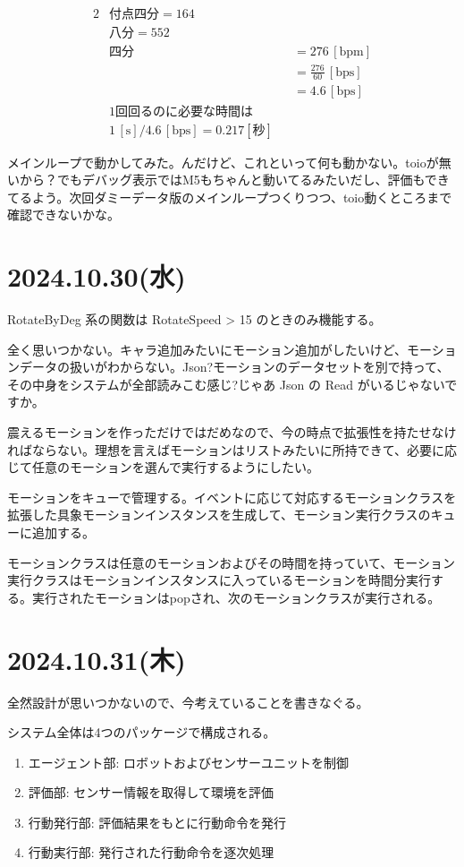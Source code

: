 \documentclass[fleqn,twocolumn]{mynote}
\begin{document}
\begin{alignat*}{2}
  & 付点四分 = 164 \\
  & 八分 = 552 \\
  & 四分 &&= 276 \, [\text{bpm}] \\
  & &&= \frac{276}{60} \, [\text{bps}] \\
  & &&= 4.6 \, [\text{bps}] \\
  & 1\text{回回るのに必要な時間は} \\
  & 1 \, [\text{s}] / 4.6 \, [\text{bps}] = 0.217[\text{秒}]
\end{alignat*}

メインループで動かしてみた。んだけど、これといって何も動かない。toioが無いから？でもデバッグ表示ではM5もちゃんと動いてるみたいだし、評価もできてるよう。次回ダミーデータ版のメインループつくりつつ、toio動くところまで確認できないかな。

\section*{2024.10.30(水)}
RotateByDeg 系の関数は RotateSpeed > 15 のときのみ機能する。

全く思いつかない。キャラ追加みたいにモーション追加がしたいけど、モーションデータの扱いがわからない。Json?モーションのデータセットを別で持って、その中身をシステムが全部読みこむ感じ?じゃあ Json の Read がいるじゃないですか。

震えるモーションを作っただけではだめなので、今の時点で拡張性を持たせなければならない。理想を言えばモーションはリストみたいに所持できて、必要に応じて任意のモーションを選んで実行するようにしたい。

モーションをキューで管理する。イベントに応じて対応するモーションクラスを拡張した具象モーションインスタンスを生成して、モーション実行クラスのキューに追加する。

モーションクラスは任意のモーションおよびその時間を持っていて、モーション実行クラスはモーションインスタンスに入っているモーションを時間分実行する。実行されたモーションはpopされ、次のモーションクラスが実行される。

\section*{2024.10.31(木)}
全然設計が思いつかないので、今考えていることを書きなぐる。

システム全体は4つのパッケージで構成される。

\begin{enumerate}
  \item エージェント部: ロボットおよびセンサーユニットを制御
  \item 評価部: センサー情報を取得して環境を評価
  \item 行動発行部: 評価結果をもとに行動命令を発行
  \item 行動実行部: 発行された行動命令を逐次処理
\end{enumerate}
\end{document}
